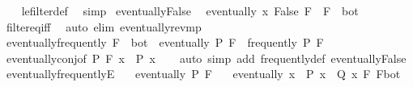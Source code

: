 \begin{isabellebody}
%
\isadelimproof
\ \ %
\endisadelimproof
%
\isatagproof
{}\isamarkupfalse%
\ le{\isacharunderscore}{\kern0pt}filter{\isacharunderscore}{\kern0pt}def\ \isamarkupfalse%
\ simp%
\endisatagproof
{\isafoldproof}%
%
\isadelimproof
\isanewline
%
\endisadelimproof
\isanewline
{}\isamarkupfalse%
\ eventually{\isacharunderscore}{\kern0pt}False{\isacharcolon}{\kern0pt}\isanewline
\ \ {\isachardoublequoteopen}eventually\ {\isacharparenleft}{\kern0pt}{\isasymlambda}x{\isachardot}{\kern0pt}\ False{\isacharparenright}{\kern0pt}\ F\ {\isasymlongleftrightarrow}\ F\ {\isacharequal}{\kern0pt}\ bot{\isachardoublequoteclose}\isanewline
%
\isadelimproof
\ \ %
\endisadelimproof
%
\isatagproof
{}\isamarkupfalse%
\ filter{\isacharunderscore}{\kern0pt}eq{\isacharunderscore}{\kern0pt}iff\ \isamarkupfalse%
\ {\isacharparenleft}{\kern0pt}auto\ elim{\isacharcolon}{\kern0pt}\ eventually{\isacharunderscore}{\kern0pt}rev{\isacharunderscore}{\kern0pt}mp{\isacharparenright}{\kern0pt}%
\endisatagproof
{\isafoldproof}%
%
\isadelimproof
\isanewline
%
\endisadelimproof
\isanewline
{}\isamarkupfalse%
\ eventually{\isacharunderscore}{\kern0pt}frequently{\isacharcolon}{\kern0pt}\ {\isachardoublequoteopen}F\ {\isasymnoteq}\ bot\ {\isasymLongrightarrow}\ eventually\ P\ F\ {\isasymLongrightarrow}\ frequently\ P\ F{\isachardoublequoteclose}\isanewline
%
\isadelimproof
\ \ %
\endisadelimproof
%
\isatagproof
{}\isamarkupfalse%
\ eventually{\isacharunderscore}{\kern0pt}conj{\isacharbrackleft}{\kern0pt}of\ P\ F\ {\isachardoublequoteopen}{\isasymlambda}x{\isachardot}{\kern0pt}\ {\isasymnot}\ P\ x{\isachardoublequoteclose}{\isacharbrackright}{\kern0pt}\isanewline
\ \ \isamarkupfalse%
\ {\isacharparenleft}{\kern0pt}auto\ simp\ add{\isacharcolon}{\kern0pt}\ frequently{\isacharunderscore}{\kern0pt}def\ eventually{\isacharunderscore}{\kern0pt}False{\isacharparenright}{\kern0pt}%
\endisatagproof
{\isafoldproof}%
%
\isadelimproof
\isanewline
%
\endisadelimproof
\isanewline
{}\isamarkupfalse%
\ eventually{\isacharunderscore}{\kern0pt}frequentlyE{\isacharcolon}{\kern0pt}\isanewline
\ \ \ {\isachardoublequoteopen}eventually\ P\ F{\isachardoublequoteclose}\isanewline
\ \ \ {\isachardoublequoteopen}eventually\ {\isacharparenleft}{\kern0pt}{\isasymlambda}x{\isachardot}{\kern0pt}\ {\isasymnot}\ P\ x\ {\isasymor}\ Q\ x{\isacharparenright}{\kern0pt}\ F{\isachardoublequoteclose}\ {\isachardoublequoteopen}F{\isasymnoteq}bot{\isachardoublequoteclose}\isanewline

\end{isabellebody}
